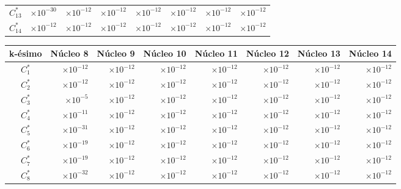 \begin{center}
\begin{tabular}[h]{|c|r|r|r|r|r|r|r|}
    $C_{13}^*$ & $\times 10^{-30}$& $\times 10^{-12}$ & $\times 10^{-12}$ & $\times 10^{-12}$ & $\times 10^{-12}$ & $\times 10^{-12}$ & $\times 10^{-12}$  \\
    $C_{14}^*$ & $\times 10^{-12}$& $\times 10^{-12}$ & $\times 10^{-12}$ & $\times 10^{-12}$ & $\times 10^{-12}$ & $\times 10^{-12}$ & $\times 10^{-12}$  \\
    \hline
\end{tabular}
\label{tabla_coeficientes_bateman1}
\end{center}

\begin{center}
\begin{tabular}[h]{|c|r|r|r|r|r|r|r|}
    \hline
    k-ésimo & \multicolumn{1}{c|}{Núcleo 8} & \multicolumn{1}{c|}{Núcleo 9} & \multicolumn{1}{c|}{Núcleo 10} & \multicolumn{1}{c|}{Núcleo 11} & \multicolumn{1}{c|}{Núcleo 12} & \multicolumn{1}{c|}{Núcleo 13} & \multicolumn{1}{c|}{Núcleo 14} \\\hline\hline
    $C_1^*$ & $\times 10^{-12}$ & $\times 10^{-12}$ & $\times 10^{-12}$ & $\times 10^{-12}$ & $\times 10^{-12}$ & $\times 10^{-12}$ & $\times 10^{-12}$ \\
    $C_2^*$ & $\times 10^{-12}$& $\times 10^{-12}$ & $\times 10^{-12}$ & $\times 10^{-12}$ & $\times 10^{-12}$ & $\times 10^{-12}$ & $\times 10^{-12}$ \\
    $C_3^*$ & $\times 10^{-5}$& $\times 10^{-12}$ & $\times 10^{-12}$ & $\times 10^{-12}$ & $\times 10^{-12}$ & $\times 10^{-12}$ & $\times 10^{-12}$ \\
    $C_4^*$ & $\times 10^{-11}$& $\times 10^{-12}$ & $\times 10^{-12}$ & $\times 10^{-12}$ & $\times 10^{-12}$ & $\times 10^{-12}$ & $\times 10^{-12}$ \\
    $C_5^*$ & $\times 10^{-31}$& $\times 10^{-12}$ & $\times 10^{-12}$ & $\times 10^{-12}$ & $\times 10^{-12}$ & $\times 10^{-12}$ & $\times 10^{-12}$ \\
    $C_6^*$ & $\times 10^{-19}$& $\times 10^{-12}$ & $\times 10^{-12}$ & $\times 10^{-12}$ & $\times 10^{-12}$ & $\times 10^{-12}$ & $\times 10^{-12}$  \\
    $C_7^*$ & $\times 10^{-19}$& $\times 10^{-12}$ & $\times 10^{-12}$ & $\times 10^{-12}$ & $\times 10^{-12}$ & $\times 10^{-12}$ & $\times 10^{-12}$  \\
    $C_8^*$ & $\times 10^{-32}$& $\times 10^{-12}$ & $\times 10^{-12}$ & $\times 10^{-12}$ & $\times 10^{-12}$ & $\times 10^{-12}$ & $\times 10^{-12}$  \\

\end{tabular}
\end{center}

